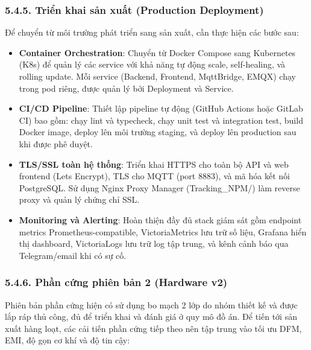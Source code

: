 \documentclass[13pt,a4paper]{extarticle}
\renewcommand{\\}{\thesislongtableorignewline\hline}%
\providecommand{\tightlist}{%
  \setlength{\itemsep}{0pt}\setlength{\parskip}{0pt}}
\begin{document}
\subsubsection{5.4.5. Triển khai sản xuất (Production
Deployment)}\label{545-triux1ec3n-khai-sux1ea3n-xuux1ea5t-production-deployment}

Để chuyển từ môi trường phát triển sang sản xuất, cần thực hiện các bước
sau:

\begin{itemize}
\tightlist
\item
  \textbf{Container Orchestration}: Chuyển từ Docker Compose sang
  Kubernetes (K8s) để quản lý các service với khả năng tự động scale,
  self-healing, và rolling update. Mỗi service (Backend, Frontend,
  MqttBridge, EMQX) chạy trong pod riêng, được quản lý bởi Deployment và
  Service.
\item
  \textbf{CI/CD Pipeline}: Thiết lập pipeline tự động (GitHub Actions
  hoặc GitLab CI) bao gồm: chạy lint và typecheck, chạy unit test và
  integration test, build Docker image, deploy lên môi trường staging,
  và deploy lên production sau khi được phê duyệt.
\item
  \textbf{TLS/SSL toàn hệ thống}: Triển khai HTTPS cho toàn bộ API và
  web frontend (Let\textquotesingle s Encrypt), TLS cho MQTT (port
  8883), và mã hóa kết nối PostgreSQL. Sử dụng Nginx Proxy Manager
  (Tracking\_NPM/) làm reverse proxy và quản lý chứng chỉ SSL.
\item
  \textbf{Monitoring và Alerting}: Hoàn thiện đầy đủ stack giám sát gồm
  endpoint metrics Prometheus-compatible, VictoriaMetrics lưu trữ số
  liệu, Grafana hiển thị dashboard, VictoriaLogs lưu trữ log tập trung,
  và kênh cảnh báo qua Telegram/email khi có sự cố.
\end{itemize}

\subsubsection{5.4.6. Phần cứng phiên bản 2 (Hardware
v2)}\label{546-phux1ea7n-cux1ee9ng-phiuxean-bux1ea3n-2-hardware-v2}

Phiên bản phần cứng hiện có sử dụng bo mạch 2 lớp do nhóm thiết kế và
được lắp ráp thủ công, đủ để triển khai và đánh giá ở quy mô đồ án. Để
tiến tới sản xuất hàng loạt, các cải tiến phần cứng tiếp theo nên tập
trung vào tối ưu DFM, EMI, độ gọn cơ khí và độ tin cậy:
\end{document}
